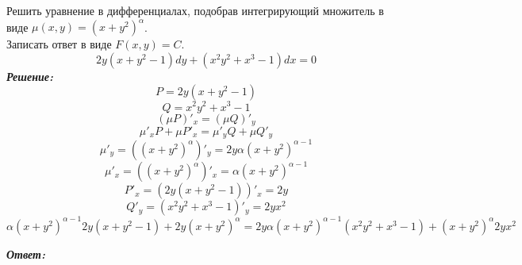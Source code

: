 \documentclass[a5paper, 10pt]{article}
\theoremstyle{definition}
\theoremstyle{plain}
\theoremstyle{remark}
\begin{document}
\newpage
\section{}
Решить уравнение в дифференциалах, подобрав интегрирующий множитель в виде $\mu (x, y) = (x+y^2)^{\alpha}$.\\
Записать ответ в виде $F(x, y) = C$.
\begin{equation*}
2y(x + y^2 - 1) dy + (x^2y^2+x^3 - 1)dx = 0
\end{equation*}
\textit{\textbf{Решение:}}\\
\begin{equation*}
P = 2y(x + y^2 - 1) 
\end{equation*}
\begin{equation*}
Q = x^2y^2+x^3 - 1
\end{equation*}
\begin{equation*}
\left( \mu P \right)'_x = \left( \mu Q \right)'_y
\end{equation*}
\begin{equation*}
 \mu'_x P + \mu P'_x = \mu'_y Q  +  \mu Q'_y
\end{equation*}
\begin{equation*}
 \mu'_y =  \left(  (x+y^2)^{\alpha} \right)'_y  = 2y{\alpha} (x+y^2)^{\alpha - 1}
\end{equation*}
\begin{equation*}
 \mu'_x =  \left(  (x+y^2)^{\alpha} \right)'_x  = {\alpha} (x+y^2)^{\alpha - 1}
\end{equation*}
\begin{equation*}
 P'_x =  \left(  2y(x + y^2 - 1)  \right)'_x = 2y
\end{equation*}
\begin{equation*}
 Q'_y=  \left(  x^2y^2+x^3 - 1  \right)'_y = 2yx^2
\end{equation*}
\begin{equation*}
  {\alpha} (x+y^2)^{\alpha - 1}  2y(x + y^2 - 1) + 2y(x+y^2)^{\alpha}  = 2y{\alpha} (x+y^2)^{\alpha - 1} ( x^2y^2+x^3 - 1)  +  (x+y^2)^{\alpha}  2yx^2
\end{equation*}









\textit{\textbf{Ответ:}}
\end{document}
